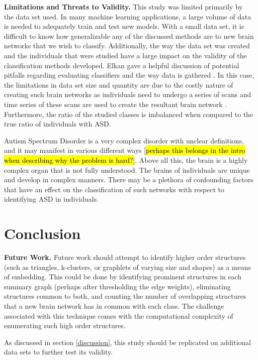 \documentclass[sigconf]{acmart}
\begin{document}
\textbf{Limitations and Threats to Validity.}
This study was limited primarily by the data set used.
In many machine learning applications, a large volume of data is needed to adequately train and test new models.
With a small data set, it is difficult to know how generalizable any of the discussed methods are to new brain networks that we wish to classify.
Additionally, the way the data set was created and the individuals that were studied have a large impact on the validity of the classification methods developed.
Elkan gave a helpful discussion of potential pitfalls regarding evaluating classifiers and the way data is gathered \cite{elkan2012}.
In this case, the limitations in data set size and quantity are due to the costly nature of creating such brain networks as individuals need to undergo a series of scans and time series of these scans are used to create the resultant brain network \cite{lanciano2020}.
Furthermore, the ratio of the studied classes is imbalanced when compared to the true ratio of individuals with ASD.

Autism Spectrum Disorder is a very complex disorder with unclear definitions, and it may manifest in various different ways [\hl{perhaps this belongs in the intro when describing why the problem is hard?}].
Above all this, the brain is a highly complex organ that is not fully understood.
The brains of individuals are unique and develop in complex manners.
There may be a plethora of confounding factors that have an effect on the classification of such networks with respect to identifying ASD in individuals.

\section{Conclusion} \label{conclusion}

\textbf{Future Work.}
Future work should attempt to identify higher order structures (such as triangles, k-clusters, or graphlets of varying size and shapes) as a means of embedding.
This could be done by identifying prominent structures in each summary graph (perhaps after thresholding the edge weights), eliminating structures common to both, and counting the number of overlapping structures that a new brain network has in common with each class.
The challenge associated with this technique comes with the computational complexity of enumerating such high order structures.

As discussed in section \ref{discussion}, this study should be replicated on additional data sets to further test its validity.
\end{document}
